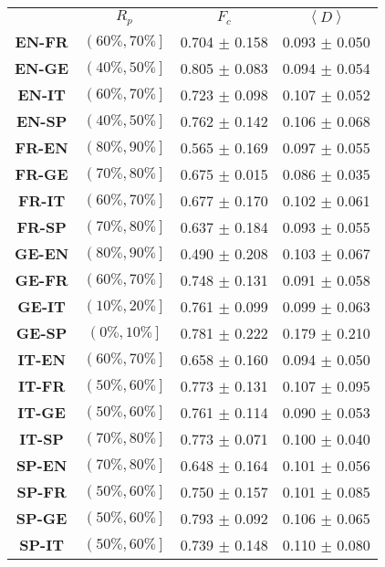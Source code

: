 \begin{table}[t]
	\centering
	\begin{tabular}{cccc}
	          & \textbf{$R_{p}$} & \textbf{$F_{c}$} & \textbf{$\left\langle D \right\rangle$} \\[2pt]
		\textbf{EN-FR} & $\left( 60\%, 70\% \right]$  & 0.704 $\pm$ 0.158 &  0.093 $\pm$ 0.050 \\
		\textbf{EN-GE} & $\left( 40\%, 50\% \right]$ & 0.805 $\pm$ 0.083 &  0.094 $\pm$ 0.054 \\
		\textbf{EN-IT} & $\left( 60\%, 70\% \right]$ & 0.723 $\pm$ 0.098 &  0.107 $\pm$ 0.052 \\ 
		\textbf{EN-SP} & $\left( 40\%, 50\% \right]$ & 0.762 $\pm$ 0.142 &  0.106 $\pm$ 0.068 \\[4pt]
		
		\textbf{FR-EN} & $\left( 80\%, 90\% \right]$ & 0.565 $\pm$ 0.169 &  0.097 $\pm$ 0.055 \\
	    \textbf{FR-GE} & $\left( 70\%, 80\% \right]$ & 0.675 $\pm$ 0.015 &  0.086 $\pm$ 0.035 \\
		\textbf{FR-IT} & $\left( 60\%, 70\% \right]$ & 0.677 $\pm$ 0.170 &  0.102 $\pm$ 0.061 \\ 
		\textbf{FR-SP} & $\left( 70\%, 80\% \right]$ & 0.637 $\pm$ 0.184 &  0.093 $\pm$ 0.055 \\[4pt]
		
		\textbf{GE-EN} & $\left( 80\%, 90\% \right]$ & 0.490 $\pm$ 0.208 &  0.103 $\pm$ 0.067 \\
		\textbf{GE-FR} & $\left( 60\%, 70\% \right]$ & 0.748 $\pm$ 0.131 &  0.091 $\pm$ 0.058 \\
		\textbf{GE-IT} & $\left( 10\%, 20\% \right]$ & 0.761 $\pm$ 0.099 &  0.099 $\pm$ 0.063 \\
		\rowcolor{malo}\textbf{GE-SP} & $\left( 0\%, 10\% \right]$ & 0.781 $\pm$ 0.222 &  0.179 $\pm$ 0.210 \\
		[4pt]
		
		\textbf{IT-EN} & $\left( 60\%, 70\% \right]$ & 0.658 $\pm$ 0.160 &  0.094 $\pm$ 0.050 \\
		\textbf{IT-FR} & $\left( 50\%, 60\% \right]$ & 0.773 $\pm$ 0.131 &  0.107 $\pm$ 0.095 \\
		\textbf{IT-GE} & $\left( 50\%, 60\% \right]$ & 0.761 $\pm$ 0.114 &  0.090 $\pm$ 0.053  \\
		\rowcolor{bueno}\textbf{IT-SP} & $\left( 70\%, 80\% \right]$ & 0.773 $\pm$ 0.071 &  0.100 $\pm$ 0.040 \\[4pt]
		
		\textbf{SP-EN} & $\left( 70\%, 80\% \right]$ & 0.648 $\pm$ 0.164 &  0.101 $\pm$ 0.056 \\
		\textbf{SP-FR} & $\left( 50\%, 60\% \right]$ & 0.750 $\pm$ 0.157 &  0.101 $\pm$ 0.085 \\
		\textbf{SP-GE} & $\left( 50\%, 60\% \right]$ & 0.793 $\pm$ 0.092 &  0.106 $\pm$ 0.065 \\
		\textbf{SP-IT} & $\left( 50\%, 60\% \right]$ & 0.739 $\pm$ 0.148 &  0.110 $\pm$ 0.080 \\
		

\end{tabular}
\end{table}
